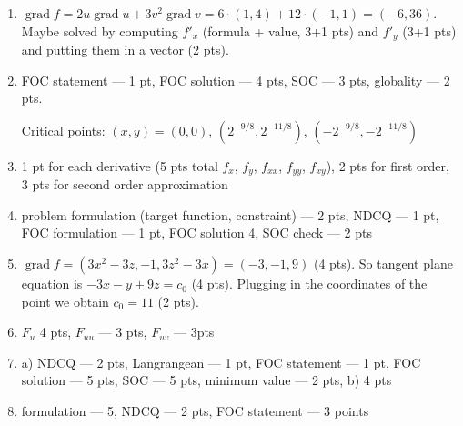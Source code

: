 \documentclass[12pt,a4paper]{article}
\DeclareMathOperator{\grad}{grad}
\begin{document}
\begin{enumerate}
\item $\grad f =2u \grad u + 3v^2 \grad v = 6\cdot (1,4)+12\cdot (-1,1)=(-6,36)$. Maybe solved by computing $f'_x$ (formula + value, 3+1 pts) and $f'_y$ (3+1 pts) and putting them in a vector (2 pts). 
\item FOC statement --- 1 pt, FOC solution --- 4 pts, SOC --- 3 pts, globality --- 2 pts.

Critical points: $(x,y)=(0,0)$, $(2^{-9/8},2^{-11/8})$, $(-2^{-9/8},-2^{-11/8})$

\item 1 pt for each derivative (5 pts total $f_x$, $f_y$, $f_{xx}$, $f_{yy}$, $f_{xy}$), 2 pts for first order, 3 pts for second order approximation

\item problem formulation (target function, constraint) --- 2 pts, NDCQ --- 1 pt, FOC formulation --- 1 pt, FOC solution 4, SOC check --- 2 pts

\item $\grad f = (3x^2-3z,-1,3z^2-3x)=(-3,-1,9)$ (4 pts). So tangent plane equation is $-3x-y+9z=c_0$ (4 pts). Plugging in the coordinates of the point we obtain $c_0=11$ (2 pts).

\item $F_u$ 4 pts, $F_{uu}$ --- 3 pts, $F_{uv}$ --- 3pts

\item a) NDCQ --- 2 pts, Langrangean --- 1 pt,  FOC statement --- 1 pt, FOC solution --- 5 pts, SOC --- 5 pts, minimum value --- 2 pts, b) 4 pts

\item formulation --- 5, NDCQ --- 2 pts, FOC statement --- 3 points

\end{enumerate}
\end{document}
